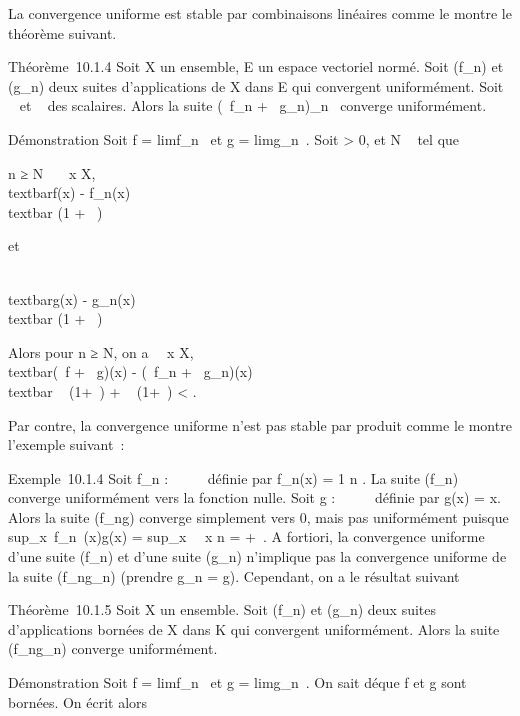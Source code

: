 \documentclass[]{article}
\begin{document}
La convergence uniforme est stable par combinaisons linéaires comme le
montre le théorème suivant.

Théorème~10.1.4 Soit X un ensemble, E un espace vectoriel normé. Soit
(f\_n) et (g\_n) deux suites d'applications de X dans E
qui convergent uniformément. Soit \alpha~ et \beta~ des scalaires. Alors la suite
(\alpha~f\_n + \beta~g\_n)\_n\in{}~ converge uniformément.

Démonstration Soit f = limf\_n~ et g
= limg\_n~. Soit \epsilon \textgreater{} 0, et
N \in {}~ tel que

n ≥ N \rigtharrow~\forall~~x \in X, \\textbar{}f(x)
- f\_n(x)\\textbar{} \leq \epsilon {}(1 + \textbar{}\alpha~\textbar{})

et

\\textbar{}g(x) -
g\_n(x)\\textbar{} \leq \epsilon {}(1
+ \textbar{}\beta~\textbar{})

Alors pour n ≥ N, on a \forall~~x \in X,
\\textbar{}(\alpha~f + \beta~g)(x) - (\alpha~f\_n +
\beta~g\_n)(x)\\textbar{} \leq\textbar{}\alpha~\textbar{} \epsilon
{}(1+\textbar{}\alpha~\textbar{}) +
\textbar{}\beta~\textbar{} \epsilon {}(1+\textbar{}\beta~\textbar{}) \textless{} \epsilon.

Par contre, la convergence uniforme n'est pas stable par produit comme
le montre l'exemple suivant~:

Exemple~10.1.4 Soit f\_n : ~ \rightarrow~ ~ définie par f\_n(x) =
1 \over n . La suite (f\_n) converge
uniformément vers la fonction nulle. Soit g : ~ \rightarrow~ ~ définie par g(x) =
x. Alors la suite (f\_ng) converge simplement vers 0, mais pas
uniformément puisque
sup\_x\in{}~\textbar{}f\_n~(x)g(x)\textbar{}
= sup\_x\in{}~~\left
\textbar{} x \over n \right \textbar{}
= +\infty~. A fortiori, la convergence uniforme d'une suite (f\_n) et
d'une suite (g\_n) n'implique pas la convergence uniforme de la
suite (f\_ng\_n) (prendre g\_n = g). Cependant,
on a le résultat suivant

Théorème~10.1.5 Soit X un ensemble. Soit (f\_n) et
(g\_n) deux suites d'applications bornées de X dans K qui
convergent uniformément. Alors la suite (f\_ng\_n)
converge uniformément.

Démonstration Soit f = limf\_n~ et g
= limg\_n~. On sait dé que f et g
sont bornées. On écrit alors
\end{document}
